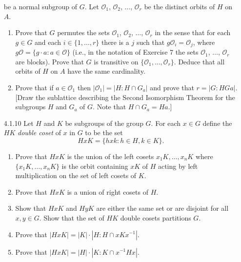 \begin{enumerate}
                  be a normal subgroup of $G$. Let $\mathcal{O}_1$,
                  $\mathcal{O}_2$, $\ldots$, $\mathcal{O}_r$ be the distinct
                  orbits of $H$ on $A$.
                  \begin{enumerate}
                     \item Prove that $G$ permutes the sets $\mathcal{O}_1$,
                           $\mathcal{O}_2$, $\ldots$, $\mathcal{O}_r$ in the
                           sense that for each $g \in G$ and each
                           $i \in \{1, \ldots, r\}$ there is a $j$ such that
                           $g\mathcal{O}_i = \mathcal{O}_j$, where
                           $g\mathcal{O} = \{g \cdot a : a \in \mathcal{O}\}$
                           (i.e., in the notation of Exercise 7 the sets
                           $\mathcal{O}_1$, $\ldots$, $\mathcal{O}_r$ are
                           blocks). Prove that $G$ is transitive on
                           $\{\mathcal{O}_1, \ldots, \mathcal{O}_r\}$. Deduce
                           that all orbits of $H$ on $A$ have the same
                           cardinality.
                     \item Prove that if $a \in \mathcal{O}_1$ then
                           $|\mathcal{O}_1| = |H : H \cap G_a|$ and prove that
                           $r = |G : HGa|$. [Draw the sublattice describing the
                           Second Isomorphism Theorem for the subgroups $H$ and
                           $G_a$ of $G$. Note that $H \cap G_a = Ha$.]
                  \end{enumerate}
   \item[4.1.10]  Let $H$ and $K$ be subgroups of the group $G$. For each
                  $x \in G$ define the $HK$ \textit{double coset} of $x$ in $G$
                  to be the set
                  $$HxK = \{hxk : h \in H, k \in K\}.$$
                  \begin{enumerate}
                     \item Prove that $HxK$ is the union of the left cosets 
                           $x_1K, \ldots, x_nK$ where $\{x_1K, \ldots, x_nK\}$
                           is the orbit containing $xK$ of $H$ acting by left
                           multiplication on the set of left cosets of $K$.
                     \item Prove that $HxK$ is a union of right cosets of $H$.
                     \item Show that $HxK$ and $HyK$ are either the same set or
                           are disjoint for all $x, y \in G$. Show that the set
                           of $HK$ double cosets partitions $G$.
                     \item Prove that $|HxK| = |K| \cdot |H : H \cap xKx^{-1}|$.
                     \item Prove that $|HxK| = |H| \cdot |K : K \cap x^{-1}Hx|$.
                  \end{enumerate}
\end{enumerate}

